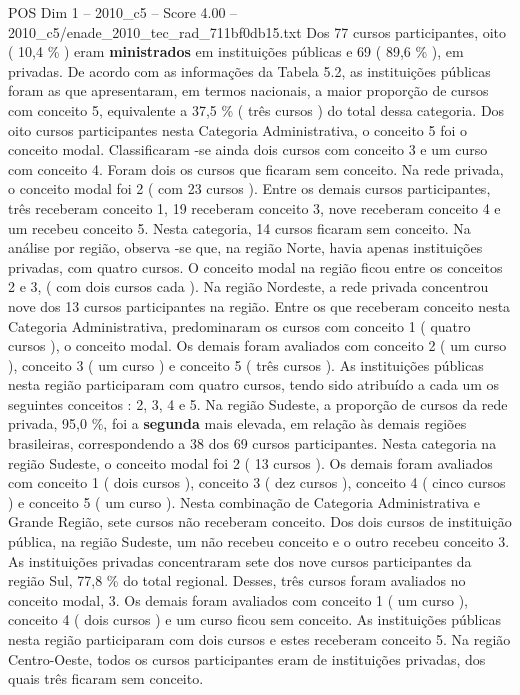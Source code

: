 \begin{textsample}{POS Dim 1 – 2010\_c5 – Score 4.00 – 2010\_c5/enade\_2010\_tec\_rad\_711bf0db15.txt}
Dos 77 cursos participantes, oito ( 10,4 \% ) eram \textbf{ministrados} em instituições públicas e 69 ( 89,6 \% ), em privadas.
De acordo com as informações da Tabela 5.2, as instituições públicas foram as que apresentaram, em termos nacionais, a maior proporção de cursos com conceito 5, equivalente a 37,5 \% ( três cursos ) do total dessa categoria.
Dos oito cursos participantes nesta Categoria Administrativa, o conceito 5 foi o conceito modal.
Classificaram -se ainda dois cursos com conceito 3 e um curso com conceito 4.
Foram dois os cursos que ficaram sem conceito.
Na rede privada, o conceito modal foi 2 ( com 23 cursos ).
Entre os demais cursos participantes, três receberam conceito 1, 19 receberam conceito 3, nove receberam conceito 4 e um recebeu conceito 5.
Nesta categoria, 14 cursos ficaram sem conceito.
Na análise por região, observa -se que, na região Norte, havia apenas instituições privadas, com quatro cursos.
O conceito modal na região ficou entre os conceitos 2 e 3, ( com dois cursos cada ).
Na região Nordeste, a rede privada concentrou nove dos 13 cursos participantes na região.
Entre os que receberam conceito nesta Categoria Administrativa, predominaram os cursos com conceito 1 ( quatro cursos ), o conceito modal.
Os demais foram avaliados com conceito 2 ( um curso ), conceito 3 ( um curso ) e conceito 5 ( três cursos ).
As instituições públicas nesta região participaram com quatro cursos, tendo sido atribuído a cada um os seguintes conceitos : 2, 3, 4 e 5.
Na região Sudeste, a proporção de cursos da rede privada, 95,0 \%, foi a \textbf{segunda} mais elevada, em relação às demais regiões brasileiras, correspondendo a 38 dos 69 cursos participantes.
Nesta categoria na região Sudeste, o conceito modal foi 2 ( 13 cursos ).
Os demais foram avaliados com conceito 1 ( dois cursos ), conceito 3 ( dez cursos ), conceito 4 ( cinco cursos ) e conceito 5 ( um curso ).
Nesta combinação de Categoria Administrativa e Grande Região, sete cursos não receberam conceito.
Dos dois cursos de instituição pública, na região Sudeste, um não recebeu conceito e o outro recebeu conceito 3.
As instituições privadas concentraram sete dos nove cursos participantes da região Sul, 77,8 \% do total regional.
Desses, três cursos foram avaliados no conceito modal, 3.
Os demais foram avaliados com conceito 1 ( um curso ), conceito 4 ( dois cursos ) e um curso ficou sem conceito.
As instituições públicas nesta região participaram com dois cursos e estes receberam conceito 5.
Na região Centro-Oeste, todos os cursos participantes eram de instituições privadas, dos quais três ficaram sem conceito.

\end{textsample}
